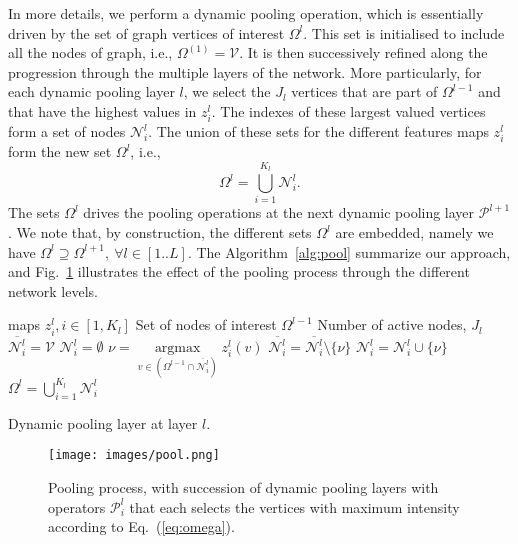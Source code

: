 \documentclass[10pt,journal,compsoc]{IEEEtran}
\begin{document}
	In more details, we perform a dynamic pooling operation, which is essentially driven by the set of graph vertices of interest $\Omega^{l}$. This set is initialised to include all the nodes of graph, i.e., $\Omega^{(1)}= \mathcal{V}$. It is then successively refined along the progression through the multiple layers of the network. More particularly, for each dynamic pooling layer $l$, we select the $J_l$ vertices that are part of $\Omega^{l-1}$ and that have the highest values in $z_i^{l}$. The indexes of these largest valued vertices form a set of nodes $\mathcal{N}_i^{l}$. The union of these sets for the different features maps $z_i^{l}$ form the new set $\Omega^{l}$, i.e.,
	\begin{equation}
	\Omega^{l} = \bigcup\limits_{i=1}^{K_{l}}\mathcal{N}_i^{l} .
	\label{eq:omega}
	\end{equation}
	The sets $\Omega^{l}$  drives the pooling operations at the next dynamic pooling layer $\mathcal{P}^{l+1}$. We note that, by construction, the different sets $\Omega^{l}$ are embedded, namely we have $\Omega^{l}  \supseteq \Omega^{l+1}, \ \forall l \in [1..L]$. The Algorithm~\ref{alg:pool} summarize our approach, and Fig.~\ref{fig:pool} illustrates the effect of the pooling process through the different network levels.

	\begin{algorithm}[h!]
		\begin{algorithmic}[1]
			\quad \Feature maps $z_i^{l}, i \in [1,K_l]$
			\STATE \qquad\quad\quad Set of nodes of interest $\Omega^{l-1}$
			\STATE \qquad\quad\quad Number of active nodes, $J_l$
			\vspace{5pt}
			\STATE $\overline{\mathcal{N}_i^{l}} = \mathcal{V}$
			\STATE $\mathcal{N}_i^{l} = \emptyset $
			\STATE $\nu =  \mathop{\arg\max} \limits_{v \in \left(\Omega^{l-1} \cap \overline{\mathcal{N}_i^{l}} \right)} z_i^{l}(v)$
			\STATE $\overline{\mathcal{N}_i^{l}} = \overline{\mathcal{N}_i^{l}} \setminus \{\nu\}$
			\STATE $\mathcal{N}_i^{l} = \mathcal{N}_i^{l} \cup \{\nu\}$
			\ENDFOR
			\ENDFOR
			\STATE $\Omega^{l}=\bigcup\limits_{i=1}^{K_{l}}\mathcal{N}_i^{l}$
		\end{algorithmic}
		\caption{Dynamic pooling layer at layer $l$.}
		\label{alg:pool}
	\end{algorithm}


	\begin{figure}[!t]
		\centering
		\texttt{[image: images/pool.png]}
		\caption{Pooling process, with succession of dynamic pooling layers with operators $\mathcal{P}_i^{l}$ that each selects the vertices with maximum intensity according to Eq.~(\ref{eq:omega}).
		}
		\label{fig:pool}
	\end{figure}
\end{document}
